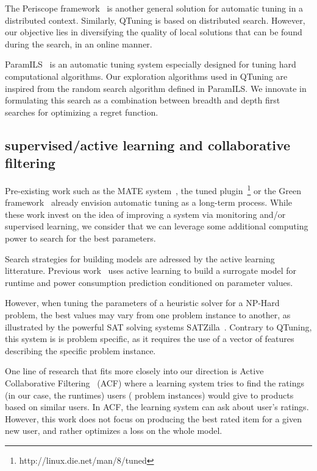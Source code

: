 \documentclass[10pt, conference, compsocconf]{IEEEtran}
\begin{document}
The Periscope framework~\cite{DBLP:conf/parco/MijakovicSUGSC13} is another
general solution for automatic tuning in a distributed context.
Similarly, QTuning is based on distributed search. However, our objective lies in
diversifying the quality of local solutions that can be found
during the search, in an online manner.

ParamILS~\cite{Hutter:2009:PAA:1734953.1734959} is an automatic tuning system
especially designed for tuning hard computational algorithms. Our
exploration algorithms used in QTuning are inspired from the random search
algorithm defined in ParamILS. We innovate in formulating this search
as a combination between breadth and depth first searches for optimizing a
regret function.

\subsection{supervised/active learning and collaborative filtering}

Pre-existing work such as the MATE system~\cite{DBLP:conf/para/MorajkoMCMS10},
the tuned plugin~\footnote{http://linux.die.net/man/8/tuned} or the Green
framework~\cite{Baek:2010:GFS:1809028.1806620} already envision automatic
tuning as a long-term process. While these work invest on the idea of
improving a system via monitoring and/or supervised learning, we consider
that we can leverage some additional computing power to search for the best 
parameters.

Search strategies for building models are adressed by the active
learning~\cite{DBLP:series/synthesis/2012Settles} litterature.  Previous
work~\cite{DBLP:conf/cluster/BalaprakashGW13} uses active learning to build a
surrogate model for runtime and power consumption prediction conditioned on
parameter values.

However, when tuning the parameters of a heuristic solver for a NP-Hard
problem, the best values may vary from one problem instance to another, as
illustrated by the powerful SAT solving systems SATZilla~\cite{xu2008satzilla}.
Contrary to QTuning, this system is is problem specific, as it requires
the use of a vector of features describing the specific problem instance.

One line of research that fits more closely into our direction is Active
Collaborative Filtering~\cite{DBLP:journals/corr/abs-1212-2442} (ACF) where a
learning system tries to find the ratings (in our case, the runtimes) users (
problem instances) would give to products based on similar users. In ACF,
the learning system can ask about user's ratings. However, this work
does not focus on producing the best rated item for a given new user, and rather
optimizes a loss on the whole model.
\end{document}
